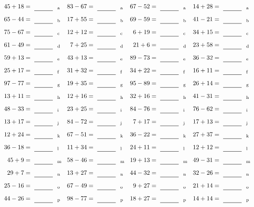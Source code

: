 \documentclass
[
  draft    = true,
  fontsize = 11pt,
  parskip  = half-
]
{scrartcl}
\begin{document}
\clearpage
\begin{align*}
    \pline{45+18}&=\rline{a}
  & \pline{83-67}&=\rline{a}
  & \pline{67-52}&=\rline{a}
  & \pline{14+28}&=\rline{a} \\[1ex]
    \pline{65-44}&=\rline{b}
  & \pline{17+55}&=\rline{b}
  & \pline{69-59}&=\rline{b}
  & \pline{41-21}&=\rline{b} \\[1ex]
    \pline{75-67}&=\rline{c}
  & \pline{12+12}&=\rline{c}
  & \pline{6+19}&=\rline{c}
  & \pline{34+15}&=\rline{c} \\[1ex]
    \pline{61-49}&=\rline{d}
  & \pline{7+25}&=\rline{d}
  & \pline{21+6}&=\rline{d}
  & \pline{23+58}&=\rline{d} \\[1ex]
    \pline{59+13}&=\rline{e}
  & \pline{43+13}&=\rline{e}
  & \pline{89-73}&=\rline{e}
  & \pline{36-32}&=\rline{e} \\[1ex]
    \pline{25+17}&=\rline{f}
  & \pline{31+32}&=\rline{f}
  & \pline{34+22}&=\rline{f}
  & \pline{16+11}&=\rline{f} \\[1ex]
    \pline{97-77}&=\rline{g}
  & \pline{19+35}&=\rline{g}
  & \pline{95-89}&=\rline{g}
  & \pline{26+14}&=\rline{g} \\[1ex]
    \pline{13+11}&=\rline{h}
  & \pline{12+16}&=\rline{h}
  & \pline{32+16}&=\rline{h}
  & \pline{41-31}&=\rline{h} \\[1ex]
    \pline{48-33}&=\rline{i}
  & \pline{23+25}&=\rline{i}
  & \pline{84-76}&=\rline{i}
  & \pline{76-62}&=\rline{i} \\[1ex]
    \pline{13+17}&=\rline{j}
  & \pline{84-72}&=\rline{j}
  & \pline{7+17}&=\rline{j}
  & \pline{17+13}&=\rline{j} \\[1ex]
    \pline{12+24}&=\rline{k}
  & \pline{67-51}&=\rline{k}
  & \pline{36-22}&=\rline{k}
  & \pline{27+37}&=\rline{k} \\[1ex]
    \pline{36-18}&=\rline{l}
  & \pline{11+34}&=\rline{l}
  & \pline{24+11}&=\rline{l}
  & \pline{12+12}&=\rline{l} \\[1ex]
    \pline{45+9}&=\rline{m}
  & \pline{58-46}&=\rline{m}
  & \pline{19+13}&=\rline{m}
  & \pline{49-31}&=\rline{m} \\[1ex]
    \pline{29+7}&=\rline{n}
  & \pline{13+27}&=\rline{n}
  & \pline{44-32}&=\rline{n}
  & \pline{32-26}&=\rline{n} \\[1ex]
    \pline{25-16}&=\rline{o}
  & \pline{67-49}&=\rline{o}
  & \pline{9+27}&=\rline{o}
  & \pline{21+14}&=\rline{o} \\[1ex]
    \pline{44-26}&=\rline{p}
  & \pline{98-77}&=\rline{p}
  & \pline{18+27}&=\rline{p}
  & \pline{14+14}&=\rline{p}
\end{align*}
\end{document}
